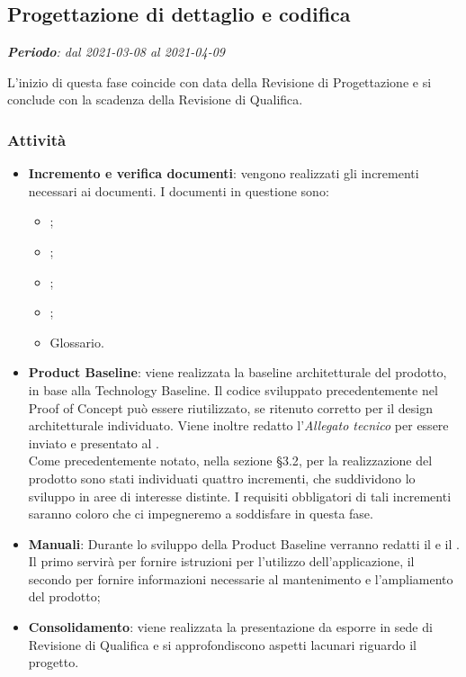 \subsection{Progettazione di dettaglio e codifica}
\textit{\textbf{Periodo}: dal 2021-03-08 al 2021-04-09}

L'inizio di questa fase coincide con data della Revisione di Progettazione e si conclude con la scadenza della Revisione di Qualifica.

\subsubsection{Attività}

\begin{itemize}
\item \textbf{Incremento e verifica documenti}: vengono realizzati gli incrementi necessari ai documenti. I documenti in questione sono:
\begin{itemize}
\item \NdP{};
\item \AdR{};
\item \PdQ{};
\item \PdP{};
\item Glossario.
\end{itemize}
\item \textbf{Product Baseline}: viene realizzata la baseline architetturale del prodotto, in base alla Technology Baseline. Il codice sviluppato precedentemente nel Proof of Concept può essere riutilizzato, se ritenuto corretto per il design architetturale individuato. Viene inoltre redatto l'\textit{Allegato tecnico} per essere inviato e presentato al \CR{}.\\ Come precedentemente notato, nella sezione \S{3.2}, per la realizzazione del prodotto sono stati individuati quattro incrementi, che suddividono lo sviluppo in aree di interesse distinte. I requisiti obbligatori di tali incrementi saranno coloro che ci impegneremo a soddisfare in questa fase.
\item \textbf{Manuali}: Durante lo sviluppo della Product Baseline verranno redatti il \MU{} e il \MM. Il primo servirà per fornire istruzioni per l'utilizzo dell'applicazione, il secondo per fornire informazioni necessarie al mantenimento e l'ampliamento del prodotto;
\item \textbf{Consolidamento}: viene realizzata la presentazione da esporre in sede di Revisione di Qualifica e si approfondiscono aspetti lacunari riguardo il progetto.
\end{itemize}

